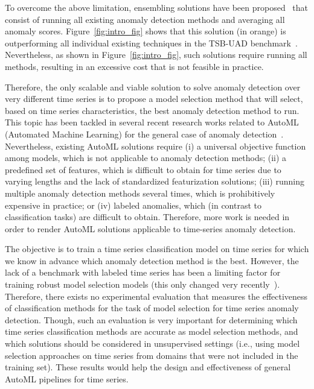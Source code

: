 To overcome the above limitation, ensembling solutions have been proposed~\cite{10.1145/2830544.2830549} that consist of running all existing anomaly detection methods and averaging all anomaly scores. Figure~\ref{fig:intro_fig} shows that this solution (in orange) is outperforming all individual existing techniques in the TSB-UAD benchmark~\cite{10.14778/3529337.3529354,boniol2022theseus}. Nevertheless, as shown in Figure~\ref{fig:intro_fig}, such solutions require running all methods, resulting in an excessive cost that is not feasible in practice.

Therefore, the only scalable and viable solution to solve anomaly detection over very different time series %
is to propose a model selection method that will select, based on time series characteristics, the best anomaly detection method to run. This topic has been tackled in several recent research works related to AutoML (Automated Machine Learning) for the general case of anomaly detection~\cite{NEURIPS2021_23c89427, https://doi.org/10.48550/arxiv.2009.04395}. %
Nevertheless, existing AutoML solutions require (i) a universal objective function among models, which is not applicable to anomaly detection methods; (ii) a predefined set of features, which is difficult to obtain for time series due to varying lengths and the lack of standardized featurization solutions; (iii) running multiple anomaly detection methods several times, which is prohibitively expensive in practice; or (iv) labeled anomalies, which (in contrast to classification tasks) are difficult to obtain. Therefore, more work is needed in order to render AutoML solutions applicable to time-series anomaly detection. 


The objective is to train a time series classification model on time series for which we know in advance which anomaly detection method is the best. However, the lack of a benchmark with labeled time series has been a limiting factor for training robust model selection models (this only changed very recently~\cite{10.14778/3529337.3529354,10.14778/3538598.3538602,kdd21}). Therefore, there exists no experimental evaluation that measures the effectiveness of classification methods for the task of model selection for time series anomaly detection. Though, such an evaluation is very important for determining which time series classification methods are accurate as model selection methods, and which solutions should be considered in unsupervised settings (i.e., using model selection approaches on time series from domains that were not included in the training set). These results would help the design and effectiveness of general AutoML pipelines for time series.

